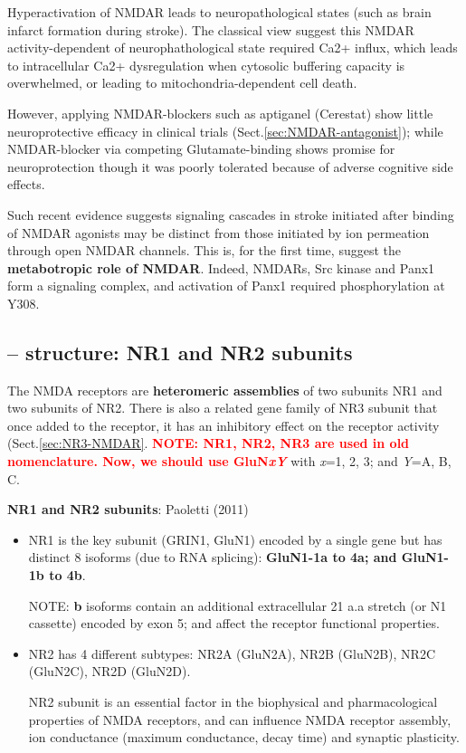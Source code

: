 Hyperactivation of NMDAR leads to  neuropathological  states (such as brain
infarct formation during stroke). The classical view suggest this NMDAR
activity-dependent of neurophathological state required Ca2+ influx, which leads
to intracellular Ca2+ dysregulation  when  cytosolic  buffering capacity  is 
overwhelmed, or leading to mitochondria-dependent cell death.

However, applying NMDAR-blockers such as aptiganel (Cerestat)  show  little
neuroprotective  efficacy  in  clinical trials
(Sect.\ref{sec:NMDAR-antagonist}); while NMDAR-blocker via competing
Glutamate-binding shows promise  for  neuroprotection  though it was  poorly
tolerated because  of  adverse  cognitive  side effects.


Such recent evidence suggests signaling cascades in stroke initiated after
binding of NMDAR agonists may be distinct from those initiated by ion permeation
through open NMDAR channels. This is, for the first time, suggest the {\bf
metabotropic role of NMDAR}. Indeed, NMDARs, Src kinase and Panx1 form a
signaling complex, and activation of Panx1 required phosphorylation at Y308. 


\subsection{-- structure: NR1 and NR2 subunits}
\label{sec:NMDAR-structure}
\label{sec:NR2-NMDAR}
\label{sec:NR1-NMDAR}
\label{sec:NMDAR-isoforms}

The NMDA receptors are {\bf heteromeric assemblies} of two subunits NR1 and two
subunits of NR2. There is also a related gene family of NR3 subunit that once
added to the receptor, it has an inhibitory effect on the receptor activity
(Sect.\ref{sec:NR3-NMDAR}. \textcolor{red}{\bf NOTE: NR1, NR2, NR3 are used in
old nomenclature. Now, we should use GluN{\it x}{\it Y}} with {\it x}=1, 2, 3;
and {\it Y}=A, B, C.

{\bf NR1 and NR2 subunits}: Paoletti (2011)
\begin{itemize}
  \item  NR1 is the key subunit (GRIN1, GluN1) encoded by a single gene but has
  distinct 8 isoforms (due to RNA splicing): {\bf GluN1-1a to 4a; and GluN1-1b
  to 4b}.
 
 NOTE: {\bf b} isoforms contain an additional extracellular 21 a.a stretch (or
 N1 cassette) encoded by exon 5; and affect the receptor functional properties. 
 
  \item NR2 has 4 different subtypes: NR2A (GluN2A), NR2B (GluN2B), NR2C
  (GluN2C), NR2D (GluN2D).

NR2 subunit is an essential factor in the biophysical and pharmacological
properties of NMDA receptors, and can influence NMDA receptor assembly, ion
conductance (maximum conductance, decay time) and synaptic plasticity.


\end{itemize}

